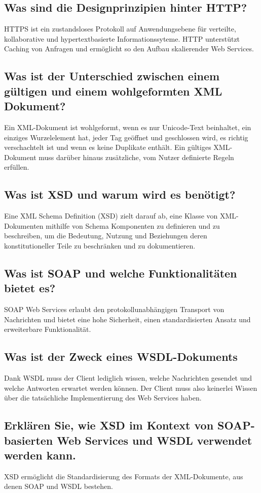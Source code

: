 \documentclass{article}
\begin{document}
\subsection{Was sind die Designprinzipien hinter HTTP?}
HTTPS ist ein zustandsloses Protokoll auf Anwendungsebene für verteilte, kollaborative und hypertextbasierte Informationssyteme. HTTP unterstützt Caching von Anfragen und ermöglicht so den Aufbau skalierender Web Services.
\subsection{Was ist der Unterschied zwischen einem gültigen und einem wohlgeformten XML Dokument?}
Ein XML-Dokument ist wohlgeformt, wenn es nur Unicode-Text beinhaltet, ein einziges Wurzelelement hat, jeder Tag geöffnet und geschlossen wird, es richtig verschachtelt ist und wenn es keine Duplikate enthält. Ein gültiges XML-Dokument muss darüber hinaus zusätzliche, vom Nutzer definierte Regeln erfüllen.
\subsection{Was ist XSD und warum wird es benötigt?}
Eine XML Schema Definition (XSD) zielt darauf ab, eine Klasse von XML-Dokumenten mithilfe von Schema Komponenten zu definieren und zu beschreiben, um die Bedeutung, Nutzung und Beziehungen deren konstitutioneller Teile zu beschränken und zu dokumentieren.
\subsection{Was ist SOAP und welche Funktionalitäten bietet es?}
SOAP Web Services erlaubt den protokollunabhängigen Transport von Nachrichten und bietet eine hohe Sicherheit, einen standardisierten Ansatz und erweiterbare Funktionalität.
\subsection{Was ist der Zweck eines WSDL-Dokuments}
Dank WSDL muss der Client lediglich wissen, welche Nachrichten gesendet und welche Antworten erwartet werden können. Der Client muss also keinerlei Wissen über die tatsächliche Implementierung des Web Services haben.
\subsection{Erklären Sie, wie XSD im Kontext von SOAP-basierten Web Services und WSDL verwendet werden kann.}
XSD ermöglicht die Standardisierung des Formats der XML-Dokumente, aus denen SOAP und WSDL bestehen.
\end{document}
